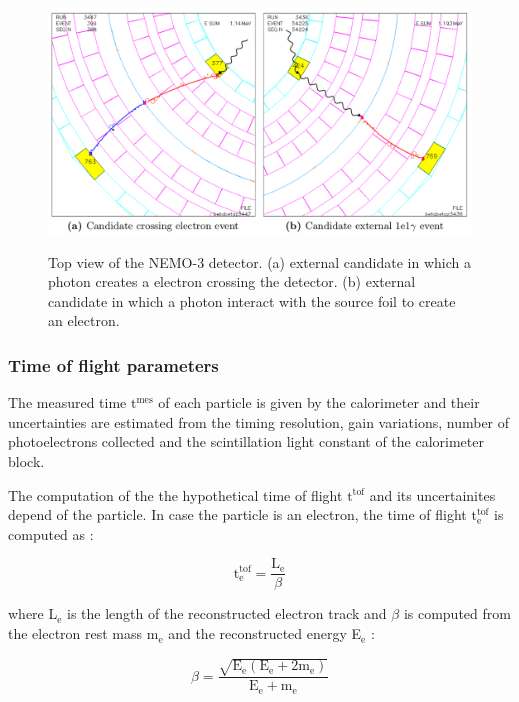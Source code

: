 \documentclass[main.tex]{subfiles}
\begin{document}
\begin{figure}[h!]
\centering
\includegraphics[scale=0.32]{pictures/Chap6/ExternalEvents.png}
\label{ExternalEventDisplay}
\caption{Top view of the NEMO-3 detector. (a) external candidate in which a photon creates a electron crossing the detector. (b) external candidate in which a photon interact with the source foil to create an electron.}
\end{figure}


\subsubsection{Time of flight parameters}\label{sec:TOFinfo}


\NI The measured time $\text{t}^{\text{mes}}$ of each particle is given by the calorimeter and their uncertainties are estimated from the timing resolution, gain variations, number of photoelectrons collected and the scintillation light constant of the calorimeter block.


\bigskip


\NI The computation of the the hypothetical time of flight $\text{t}^{\text{tof}}$ and its uncertainites depend of the particle. In case the particle is an electron, the time of flight $\text{t}_{\text{e}}^{\text{tof}}$ is computed as :


\begin{equation}\label{eq:TOFhyp}
\text{t}_\text{e}^{\text{tof}} = \frac{\text{L}_\text{e}}{\beta}
\end{equation}


\bigskip


\NI where L$_\text{e}$ is the length of the reconstructed electron track and $\beta$ is computed from the electron rest mass m$_\text{e}$ and the reconstructed energy E$_\text{e}$ : 


\begin{equation}
\beta = \frac{ \sqrt{\text{E}_\text{e} (\text{E}_\text{e} +\text{2m}_\text{e})} }{\text{E}_\text{e} + \text{m}_\text{e}}
\end{equation}
\end{document}
